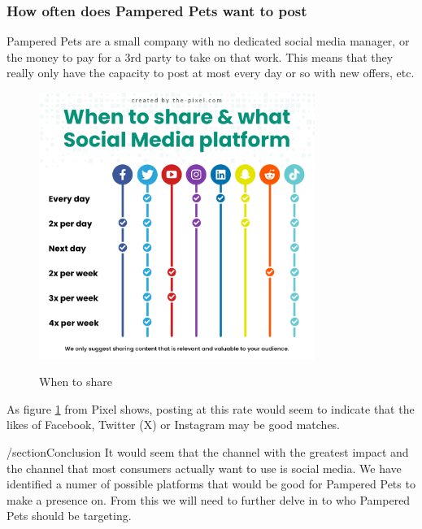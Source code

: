 \documentclass{article}
\begin{document}
\subsubsection{How often does Pampered Pets want to post}
Pampered Pets are a small company with no dedicated social media manager, or the money to pay for a 3rd party to take on that work. 
This means that they really only have the capacity to post at most every day or so with new offers, etc. 
\begin{figure}[ht]
    \caption{When to share}
    \centering
    \includegraphics[width=0.8\textwidth]{sharing-on-social-media-channels}
    \label{fig:days}
    \end{figure}
    \FloatBarrier
 As figure \ref{fig:days} from Pixel \cite{pixel} shows, posting at this rate would seem to indicate that the likes of Facebook, Twitter (X) or Instagram may be good matches.

 /section{Conclusion}
 It would seem that the channel with the greatest impact and the channel that most consumers actually want to use is social media. We have identified a numer of possible platforms that would be good for Pampered Pets to make a presence on. From this we will need to further delve in to who Pampered Pets should be targeting.


\end{document}
